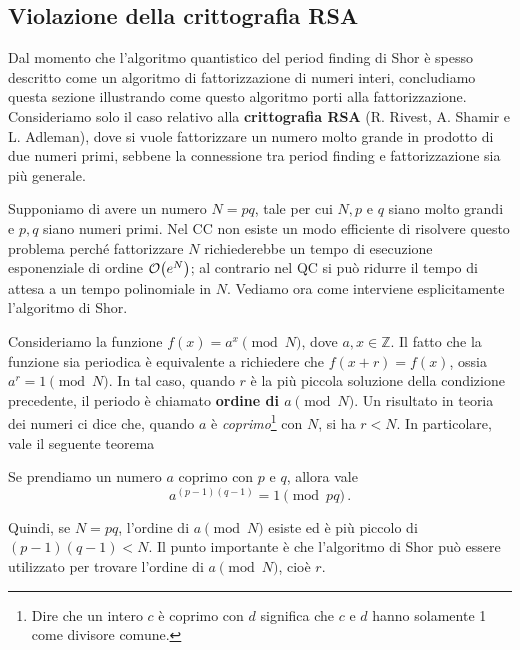 
\vspace{1cm}
\noindent{}
\vspace{0.5cm}
\subsection{Violazione della crittografia RSA}
Dal momento che l'algoritmo quantistico del period finding di Shor è spesso descritto come un algoritmo di fattorizzazione di numeri interi, concludiamo questa sezione illustrando come questo algoritmo porti alla fattorizzazione. Consideriamo solo il caso relativo alla \textbf{crittografia RSA} (R. Rivest, A. Shamir e L. Adleman), dove si vuole fattorizzare un numero molto grande in prodotto di due numeri primi, sebbene la connessione tra period finding e fattorizzazione sia più generale.

\noindent Supponiamo di avere un numero $N=pq$, tale per cui $N, p$ e $q$ siano molto grandi e $p,q$ siano numeri primi. Nel CC non esiste un modo efficiente di risolvere questo problema perché fattorizzare $N$ richiederebbe un tempo di esecuzione esponenziale di ordine $\order{e^N}$; al contrario nel QC si può ridurre il tempo di attesa a un tempo polinomiale in $N$. Vediamo ora come interviene esplicitamente l'algoritmo di Shor.

\noindent Consideriamo la funzione $f(x)=a^x\pmod N$, dove $a, x \in \mathbb{Z}$. Il fatto che la funzione sia periodica è equivalente a richiedere che $f(x+r)=f(x)$, ossia $a^r = 1 \pmod N$. In tal caso, quando $r$ è la più piccola soluzione della condizione precedente, il periodo è chiamato \textbf{ordine di $a \pmod N$}. Un risultato in teoria dei numeri ci dice che, quando $a$ è \textit{coprimo}\footnote{Dire che un intero $c$ è coprimo con $d$ significa che $c$ e $d$ hanno solamente 1 come divisore comune.} con $N$, si ha $r < N$. In particolare, vale il seguente teorema

\begin{teorema}
    Se prendiamo un numero $a$ coprimo con $p$ e $q$, allora vale
    \begin{equation*}
        a^{(p-1)(q-1)}=1\pmod{pq} \, .
    \end{equation*}
\end{teorema}

\noindent  Quindi, se $N= p q$,  l'ordine di $a \pmod N$ esiste ed \`e pi\`u piccolo di $(p-1)(q-1)< N$.  Il punto importante è che  l'algoritmo di Shor può essere utilizzato per trovare l'ordine di $a\pmod N$, cioè $r$.

